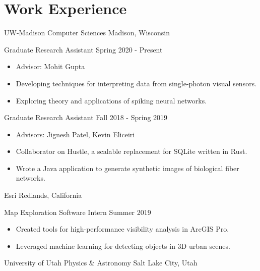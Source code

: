 \section*{Work Experience}

\begin{tab1} UW-Madison Computer Sciences \> Madison, Wisconsin \end{tab1}

\begin{tab2} Graduate Research Assistant \> Spring 2020 - Present \end{tab2}
\begin{itemize}
    \item Advisor: Mohit Gupta
    \item Developing techniques for interpreting data from single-photon visual sensors.
    \item Exploring theory and applications of spiking neural networks.
\end{itemize}

\begin{tab2} Graduate Research Assistant \> Fall 2018 - Spring 2019 \end{tab2}
\begin{itemize}
    \item Advisors: Jignesh Patel, Kevin Eliceiri
    \item Collaborator on Hustle, a scalable replacement for SQLite written in Rust.
    \item Wrote a Java application to generate synthetic images of biological fiber networks.
\end{itemize}

\blockskip

\begin{tab1} Esri \> Redlands, California \end{tab1}

\begin{tab2} Map Exploration Software Intern \> Summer 2019 \end{tab2}
\begin{itemize}
    \item Created tools for high-performance visibility analysis in ArcGIS Pro.
    \item Leveraged machine learning for detecting objects in 3D urban scenes.
\end{itemize}

\blockskip

\begin{tab1} University of Utah Physics \& Astronomy \> Salt Lake City, Utah \end{tab1}

